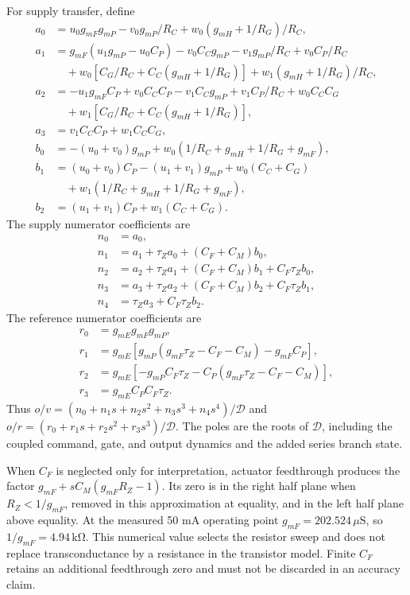 For supply transfer, define
\begin{align}
 a_0&=u_0g_{mF}g_{mP}-v_0g_{mP}/R_C+w_0(g_{mH}+1/R_G)/R_C,\\
 a_1&=g_{mF}(u_1g_{mP}-u_0C_P)-v_0C_Cg_{mP}-v_1g_{mP}/R_C+v_0C_P/R_C\\
     &\quad+w_0[C_G/R_C+C_C(g_{mH}+1/R_G)]+w_1(g_{mH}+1/R_G)/R_C,\\
 a_2&=-u_1g_{mF}C_P+v_0C_CC_P-v_1C_Cg_{mP}+v_1C_P/R_C+w_0C_CC_G\\
     &\quad+w_1[C_G/R_C+C_C(g_{mH}+1/R_G)],\\
 a_3&=v_1C_CC_P+w_1C_CC_G,\\
 b_0&=-(u_0+v_0)g_{mP}+w_0(1/R_C+g_{mH}+1/R_G+g_{mF}),\\
 b_1&=(u_0+v_0)C_P-(u_1+v_1)g_{mP}+w_0(C_C+C_G)\\
     &\quad+w_1(1/R_C+g_{mH}+1/R_G+g_{mF}),\\
 b_2&=(u_1+v_1)C_P+w_1(C_C+C_G).
\end{align}
The supply numerator coefficients are
\begin{align}
 n_0&=a_0,\\n_1&=a_1+\tau_Za_0+(C_F+C_M)b_0,\\
 n_2&=a_2+\tau_Za_1+(C_F+C_M)b_1+C_F\tau_Zb_0,\\
 n_3&=a_3+\tau_Za_2+(C_F+C_M)b_2+C_F\tau_Zb_1,\\
 n_4&=\tau_Za_3+C_F\tau_Zb_2.
\end{align}
The reference numerator coefficients are
\begin{align}
 r_0&=g_{mE}g_{mF}g_{mP},\\
 r_1&=g_{mE}\left[g_{mP}(g_{mF}\tau_Z-C_F-C_M)-g_{mF}C_P\right],\\
 r_2&=g_{mE}\left[-g_{mP}C_F\tau_Z-C_P(g_{mF}\tau_Z-C_F-C_M)\right],\\
 r_3&=g_{mE}C_PC_F\tau_Z.
\end{align}
Thus $o/v=(n_0+n_1s+n_2s^2+n_3s^3+n_4s^4)/\mathcal D$ and $o/r=(r_0+r_1s+r_2s^2+r_3s^3)/\mathcal D$. The poles are the roots of $\mathcal D$, including the coupled command, gate, and output dynamics and the added series branch state.

When $C_F$ is neglected only for interpretation, actuator feedthrough produces the factor $g_{mF}+sC_M(g_{mF}R_Z-1)$. Its zero is in the right half plane when $R_Z<1/g_{mF}$, removed in this approximation at equality, and in the left half plane above equality. At the measured 50 mA operating point $g_{mF}=202.524\,\mu\mathrm S$, so $1/g_{mF}=4.94\,\mathrm{k\Omega}$. This numerical value selects the resistor sweep and does not replace transconductance by a resistance in the transistor model. Finite $C_F$ retains an additional feedthrough zero and must not be discarded in an accuracy claim.

